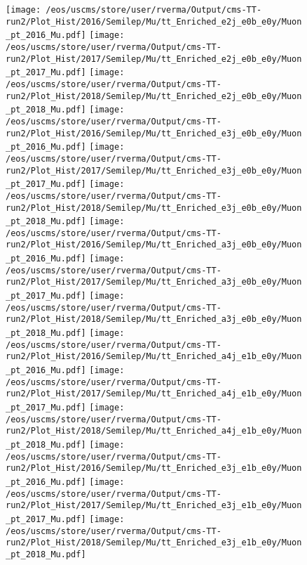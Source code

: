 \begin{figure}
\centering
\texttt{[image: /eos/uscms/store/user/rverma/Output/cms-TT-run2/Plot\_Hist/2016/Semilep/Mu/tt\_Enriched\_e2j\_e0b\_e0y/Muon\_pt\_2016\_Mu.pdf]}
\texttt{[image: /eos/uscms/store/user/rverma/Output/cms-TT-run2/Plot\_Hist/2017/Semilep/Mu/tt\_Enriched\_e2j\_e0b\_e0y/Muon\_pt\_2017\_Mu.pdf]}
\texttt{[image: /eos/uscms/store/user/rverma/Output/cms-TT-run2/Plot\_Hist/2018/Semilep/Mu/tt\_Enriched\_e2j\_e0b\_e0y/Muon\_pt\_2018\_Mu.pdf]}
\texttt{[image: /eos/uscms/store/user/rverma/Output/cms-TT-run2/Plot\_Hist/2016/Semilep/Mu/tt\_Enriched\_e3j\_e0b\_e0y/Muon\_pt\_2016\_Mu.pdf]}
\texttt{[image: /eos/uscms/store/user/rverma/Output/cms-TT-run2/Plot\_Hist/2017/Semilep/Mu/tt\_Enriched\_e3j\_e0b\_e0y/Muon\_pt\_2017\_Mu.pdf]}
\texttt{[image: /eos/uscms/store/user/rverma/Output/cms-TT-run2/Plot\_Hist/2018/Semilep/Mu/tt\_Enriched\_e3j\_e0b\_e0y/Muon\_pt\_2018\_Mu.pdf]}
\texttt{[image: /eos/uscms/store/user/rverma/Output/cms-TT-run2/Plot\_Hist/2016/Semilep/Mu/tt\_Enriched\_a3j\_e0b\_e0y/Muon\_pt\_2016\_Mu.pdf]}
\texttt{[image: /eos/uscms/store/user/rverma/Output/cms-TT-run2/Plot\_Hist/2017/Semilep/Mu/tt\_Enriched\_a3j\_e0b\_e0y/Muon\_pt\_2017\_Mu.pdf]}
\texttt{[image: /eos/uscms/store/user/rverma/Output/cms-TT-run2/Plot\_Hist/2018/Semilep/Mu/tt\_Enriched\_a3j\_e0b\_e0y/Muon\_pt\_2018\_Mu.pdf]}
\texttt{[image: /eos/uscms/store/user/rverma/Output/cms-TT-run2/Plot\_Hist/2016/Semilep/Mu/tt\_Enriched\_a4j\_e1b\_e0y/Muon\_pt\_2016\_Mu.pdf]}
\texttt{[image: /eos/uscms/store/user/rverma/Output/cms-TT-run2/Plot\_Hist/2017/Semilep/Mu/tt\_Enriched\_a4j\_e1b\_e0y/Muon\_pt\_2017\_Mu.pdf]}
\texttt{[image: /eos/uscms/store/user/rverma/Output/cms-TT-run2/Plot\_Hist/2018/Semilep/Mu/tt\_Enriched\_a4j\_e1b\_e0y/Muon\_pt\_2018\_Mu.pdf]}
\texttt{[image: /eos/uscms/store/user/rverma/Output/cms-TT-run2/Plot\_Hist/2016/Semilep/Mu/tt\_Enriched\_e3j\_e1b\_e0y/Muon\_pt\_2016\_Mu.pdf]}
\texttt{[image: /eos/uscms/store/user/rverma/Output/cms-TT-run2/Plot\_Hist/2017/Semilep/Mu/tt\_Enriched\_e3j\_e1b\_e0y/Muon\_pt\_2017\_Mu.pdf]}
\texttt{[image: /eos/uscms/store/user/rverma/Output/cms-TT-run2/Plot\_Hist/2018/Semilep/Mu/tt\_Enriched\_e3j\_e1b\_e0y/Muon\_pt\_2018\_Mu.pdf]}
\end{figure}

